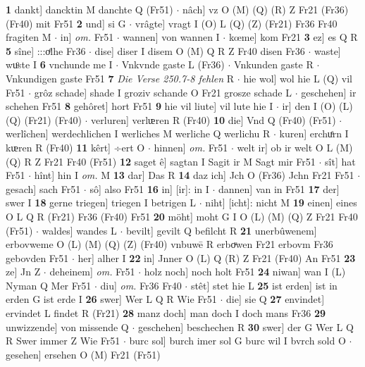 \documentclass[8pt,a4paper,notitlepage]{article}
\begin{document}
\begin{table}[ht]
\begin{minipage}[t]{0.5\linewidth}
\textbf{1} dankt] dancktin M danchte Q (Fr51)  $\cdot$ nâch] vz O (M) (Q) (R) Z Fr21 (Fr36) (Fr40) mit Fr51 \textbf{2} und] si G  $\cdot$ vrâgte] vragt I (O) L (Q) (Z) (Fr21) Fr36 Fr40 fragiten M  $\cdot$ in] \textit{om.} Fr51  $\cdot$ wannen] von wannen I  $\cdot$ kœme] kom Fr21 \textbf{3} ez] es Q R \textbf{5} sîne] :::oͤlhe Fr36  $\cdot$ dise] diser I disem O (M) Q R Z Fr40 disen Fr36  $\cdot$ waste] wuͦste I \textbf{6} vnchunde me I  $\cdot$ Vnkvnde gaste L (Fr36)  $\cdot$ Vnkunden gaste R  $\cdot$ Vnkundigen gaste Fr51 \textbf{7} \textit{Die Verse 250.7-8 fehlen} R   $\cdot$ hie wol] wol hie L (Q) vil Fr51  $\cdot$ grôz schade] shade I groziv schande O Fr21 grosze schade L  $\cdot$ geschehen] ir schehen Fr51 \textbf{8} gehôret] hort Fr51 \textbf{9} hie vil liute] vil lute hie I  $\cdot$ ir] den I (O) (L) (Q) (Fr21) (Fr40)  $\cdot$ verluren] verlᵫren R (Fr40) \textbf{10} die] Vnd Q (Fr40) (Fr51)  $\cdot$ werlîchen] werdechlichen I werliches M werliche Q werlichu R  $\cdot$ kuren] erchuͤrn I kᵫren R (Fr40) \textbf{11} kêrt] ÷ert O  $\cdot$ hinnen] \textit{om.} Fr51  $\cdot$ welt ir] ob ir welt O L (M) (Q) R Z Fr21 Fr40 (Fr51) \textbf{12} saget ê] sagtan I Sagit ir M Sagt mir Fr51  $\cdot$ sît] hat Fr51  $\cdot$ hînt] hin I \textit{om.} M \textbf{13} dar] Das R \textbf{14} daz ich] Jch O (Fr36) Jchn Fr21 Fr51  $\cdot$ gesach] sach Fr51  $\cdot$ sô] also Fr51 \textbf{16} in] [ir]: in I  $\cdot$ dannen] van in Fr51 \textbf{17} der] swer I \textbf{18} gerne triegen] triegen I betrigen L  $\cdot$ niht] [icht]: nicht M \textbf{19} einen] eines O L Q R (Fr21) Fr36 (Fr40) Fr51 \textbf{20} möht] moht G I O (L) (M) (Q) Z Fr21 Fr40 (Fr51)  $\cdot$ waldes] wandes L  $\cdot$ bevilt] gevilt Q befilcht R \textbf{21} unerbûwenem] erbovweme O (L) (M) (Q) (Z) (Fr40) vnbuwē R erboͮwen Fr21 erbovm Fr36 gebovden Fr51  $\cdot$ her] alher I \textbf{22} in] Jnner O (L) Q (R) Z Fr21 (Fr40) An Fr51 \textbf{23} ze] Jn Z  $\cdot$ deheinem] \textit{om.} Fr51  $\cdot$ holz noch] noch holt Fr51 \textbf{24} niwan] wan I (L) Nyman Q Mer Fr51  $\cdot$ diu] \textit{om.} Fr36 Fr40  $\cdot$ stêt] stet hie L \textbf{25} ist erden] ist in erden G ist erde I \textbf{26} swer] Wer L Q R Wie Fr51  $\cdot$ die] sie Q \textbf{27} envindet] ervindet L findet R (Fr21) \textbf{28} manz doch] man doch I doch mans Fr36 \textbf{29} unwizzende] von missende Q  $\cdot$ geschehen] beschechen R \textbf{30} swer] der G Wer L Q R Swer immer Z Wie Fr51  $\cdot$ burc sol] burch imer sol G burc wil I bvrch sold O  $\cdot$ gesehen] ersehen O (M) Fr21 (Fr51) \newline
\end{minipage}

\end{table}
\end{document}
